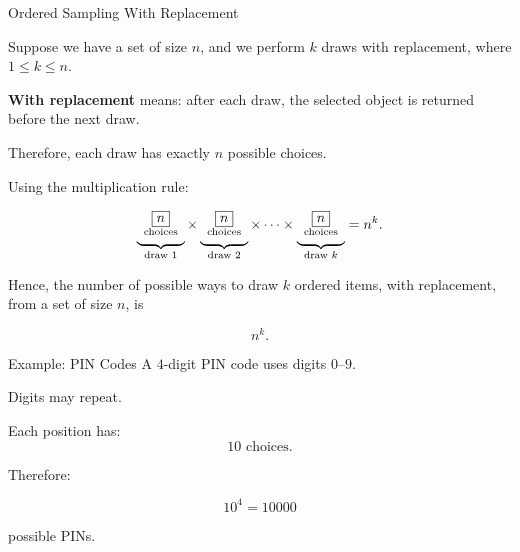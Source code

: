 \begin{frame}{Ordered Sampling With Replacement}

Suppose we have a set of size $n$, and we perform $k$ draws with replacement, where $1\leq k \leq n$.

\vspace{0.25cm}

\textbf{With replacement} means:
after each draw, the selected object is returned before the next draw.

\vspace{0.35cm}

Therefore, each draw has exactly $n$ possible choices.

\vspace{0.25cm}

Using the multiplication rule:

\[
\underbrace{
\begin{array}{c}
\fbox{$n$}\\[-1mm]
{\text{\scriptsize choices}}
\end{array}
}_{\text{draw }1}
\times
\underbrace{
\begin{array}{c}
\fbox{$n$}\\[-1mm]
{\text{\scriptsize choices}}
\end{array}
}_{\text{draw }2}
\times
\cdots
\times
\underbrace{
\begin{array}{c}
\fbox{$n$}\\[-1mm]
{\text{\scriptsize choices}}
\end{array}
}_{\text{draw }k}
=
n^k.
\]

\vspace{0.25cm}

Hence, the number of possible ways to draw $k$ ordered items, with replacement, from a set of size $n$, is 

\[
{n^k}.
\]

\end{frame}

\begin{frame}{Example: PIN Codes}
A $4$-digit PIN code uses digits $0$--$9$.

Digits may repeat.

\vspace{0.25cm}

Each position has:
\[
10 \text{ choices}.
\]

Therefore:

\[
10^4 = 10000
\]

possible PINs.
\end{frame}





